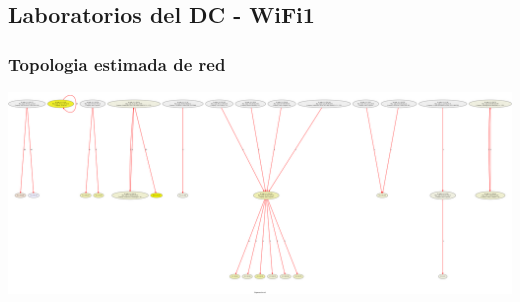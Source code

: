 \subsection{Laboratorios del DC - WiFi1}%
\subsubsection{Topologia estimada de red}
\includegraphics[scale=0.22]{../experimentacion-svilerino/labo-entrepisodc/graph.png}

